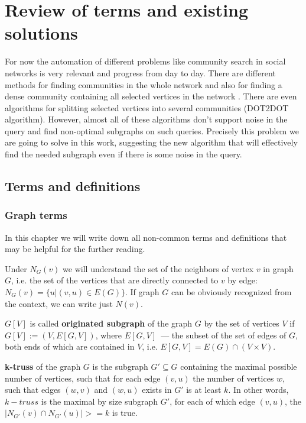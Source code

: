 \chapter{Review of terms and existing solutions}

\startrelatedwork

For now the automation of different problems like community search in social networks is very relevant and progress from day to day. There are different methods for finding communities in the whole network \cite{Newman04, Newman06, Fortunato10, Cui13} and also for finding a dense community containing all selected vertices in the network \cite{Faloutsos06, Wiener15, Huang15, Barbieri15}. There are even algorithms for splitting selected vertices into several communities \cite{Akoglu13} (DOT2DOT algorithm). However, almost all of these algorithms don't support noise in the query and find non-optimal subgraphs on such queries. Precisely this problem we are going to solve in this work, suggesting the new algorithm that will effectively find the needed subgraph even if there is some noise in the query.

\section{Terms and definitions}

\subsection{Graph terms}

In this chapter we will write down all non-common terms and definitions that may be helpful for the further reading.


Under \textbf{$N_G(v)$} we will understand the set of the neighbors of vertex $v$ in graph $G$, i.e. the set of the vertices that are directly connected to $v$ by edge: $N_G(v) = \{u | (v, u) \in E(G)\}$. If graph $G$ can be obviously recognized from the context, we can write just $N(v)$.

\textbf{$G[V]$} is called \textbf{originated subgraph} of the graph $G$ by the set of vertices $V$ if $G[V] := (V, E[G, V])$, where $E[G, V]$~--- the subset of the set of edges of $G$, both ends of which are contained in $V$, i.e. $E[G, V] = E(G) \cap (V \times V)$.

\textbf{k-truss} of the graph $G$ is the subgraph $G' \subseteq G$ containing the maximal possible number of vertices, such that for each edge $(v, u)$ the number of vertices $w$, such that edges $(w, v)$ and $(w, u)$ exists in $G'$ is at least $k$. In other words, $k-truss$ is the maximal by size subgraph $G'$, for each of which edge $(v, u)$, the $|N_{G'}(v) \cap N_{G'}(u)| >= k$ is true.

